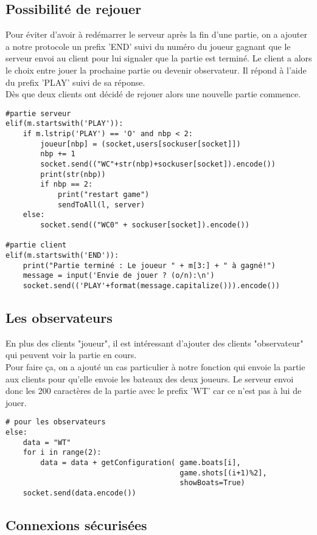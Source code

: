 \documentclass[12pt]{article}
\begin{document}
\subsection{Possibilité de rejouer}
\textnormal{
Pour éviter d'avoir à redémarrer le serveur après la fin d'une partie, on a ajouter a notre protocole un prefix 'END' suivi du numéro du joueur gagnant que le serveur envoi au client pour lui signaler que la partie est terminé. Le client a alors le choix entre jouer la prochaine partie ou devenir observateur. Il répond à l'aide du prefix 'PLAY' suivi de sa réponse.\\
Dès que deux clients ont décidé de rejouer alors une nouvelle partie commence.
}
\begin{verbatim}
#partie serveur
elif(m.startswith('PLAY')):
    if m.lstrip('PLAY') == 'O' and nbp < 2:
        joueur[nbp] = (socket,users[sockuser[socket]])
        nbp += 1
        socket.send(("WC"+str(nbp)+sockuser[socket]).encode())
        print(str(nbp))
        if nbp == 2:
            print("restart game")
            sendToAll(l, server)
    else:
        socket.send(("WC0" + sockuser[socket]).encode())

#partie client
elif(m.startswith('END')):
    print("Partie terminé : Le joueur " + m[3:] + " à gagné!")
    message = input('Envie de jouer ? (o/n):\n')
    socket.send(('PLAY'+format(message.capitalize())).encode())
\end{verbatim}

\subsection{Les observateurs}
\textnormal{
En plus des clients "joueur", il est intéressant d'ajouter des clients "observateur" qui peuvent voir la partie en cours.\\
Pour faire ça, on a ajouté un cas particulier à notre fonction qui envoie la partie aux clients pour qu'elle envoie les bateaux des deux joueurs. Le serveur envoi donc les 200 caractères de la partie avec le prefix 'WT' car ce n'est pas à lui de jouer.
}
\begin{verbatim}
# pour les observateurs
else:
    data = "WT"
    for i in range(2):
        data = data + getConfiguration( game.boats[i],
                                        game.shots[(i+1)%2],
                                        showBoats=True)
    socket.send(data.encode())
\end{verbatim}

\subsection{Connexions sécurisées}
\end{document}
